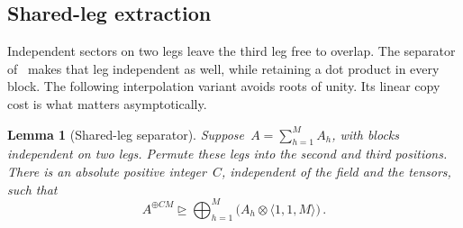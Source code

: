 \documentclass[11pt,letterpaper]{article}
\newtheorem{lemma}[theorem]{Lemma}
\theoremstyle{definition}
\numberwithin{equation}{section}
\newcommand{\degen}{\unrhd}
\begin{document}
\subsection{Shared-leg extraction}\label{sec:extraction}

Independent sectors on two legs leave the third leg free to overlap. The separator of~\cite[Proposition 3.1]{OpenAI} makes that leg independent as well, while retaining a dot product in every block. The following interpolation variant avoids roots of unity. Its linear copy cost is what matters asymptotically.

\begin{lemma}[Shared-leg separator]\label{lem:separator}
Suppose~$A=\sum_{h=1}^M A_h$, with blocks independent on two legs. Permute these legs into the second and third positions. There is an absolute positive integer~$C$, independent of the field and the tensors, such that
\begin{equation}\label{eq:separator}
 A^{\oplus CM}\degen\bigoplus_{h=1}^M\bigl(A_h\otimes \langle1,1,M\rangle\bigr)\,.
\end{equation}
\end{lemma}
\end{document}
